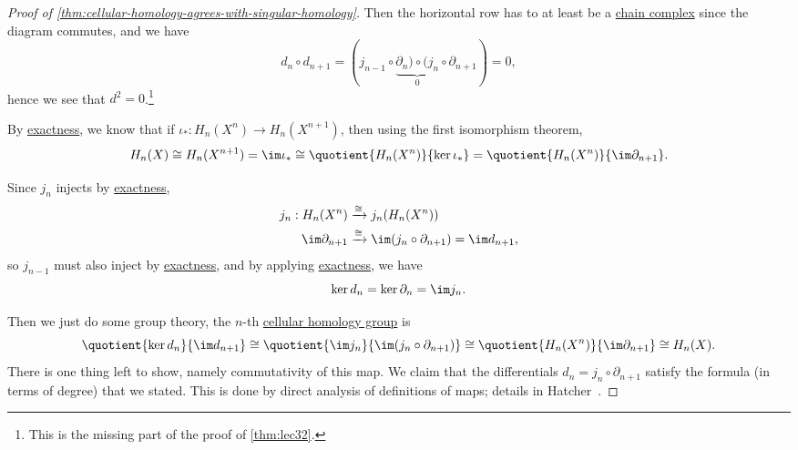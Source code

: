 \begin{proof}[Proof of \autoref{thm:cellular-homology-agrees-with-singular-homology}]
	Then the horizontal row has to at least be a \hyperref[def:chain-complex]{chain complex} since the diagram commutes, and we have
	\[
		d_{n} \circ d_{n+1}  = (j_{n - 1} \circ \underbrace{\partial_n) \circ (j_n}_{0} \circ \partial_{n + 1}) = 0,
	\]
	hence we see that \(d^{2} = 0\).\footnote{This is the missing part of the proof of \autoref{thm:lec32}.}

	By \hyperref[def:exact]{exactness}, we know that if \(\iota_\ast \colon H_n(X^n) \to H_n(X^{n + 1})\), then using the first isomorphism theorem,
	\[
		H_n(X) \cong H_n(X^{n + 1}) = \im \iota_\ast \cong  \quotient{H_n(X^n)}{\ker \iota_\ast} = \quotient{H_n(X^n)}{\im \partial_{n + 1}}.
	\]

	Since \(j_n\) injects by \hyperref[def:exact]{exactness},
	\begin{align*}
		j_n : H_n(X^n)       & \xrightarrow{\cong} j_n(H_n(X^n))                                     \\
		\im \partial_{n + 1} & \xrightarrow{\cong} \im (j_n \circ \partial_{n + 1}) = \im d_{n + 1},
	\end{align*}
	so \(j_{n - 1}\) must also inject by \hyperref[def:exact]{exactness}, and by applying \hyperref[def:exact]{exactness}, we have
	\[
		\ker d_n = \ker \partial_n = \im j_n.
	\]

	Then we just do some group theory, the \(n\)-th \hyperref[def:cellular-homology-group]{cellular homology group} is
	\[
		\quotient{\ker d_n}{\im d_{n + 1}} \cong \quotient{\im j_n}{\im (j_n \circ \partial_{n + 1})} \cong \quotient{H_n(X^n)}{\im \partial_{n + 1}} \cong H_n(X).
	\]
	There is one thing left to show, namely commutativity of this map. We claim that the differentials \(d_n = j_n \circ \partial_{n + 1}\) satisfy the formula (in terms of degree) that we stated. This is done by direct analysis of definitions of maps; details in Hatcher~\cite{hatcher2002algebraic}.
\end{proof}
